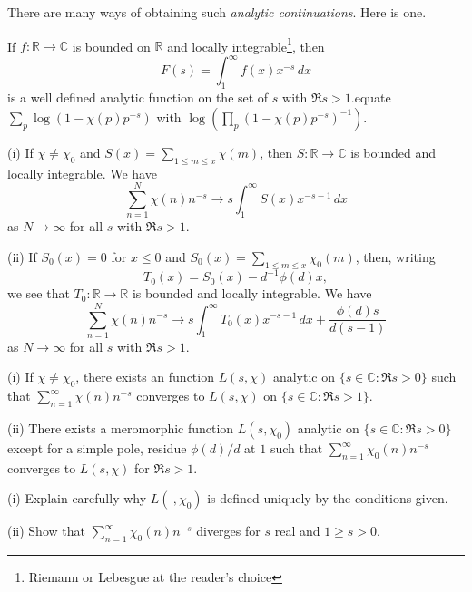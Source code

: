 There are many ways of obtaining such
\emph{analytic continuations}. Here is one.
\begin{lemma} If $f:{\mathbb R}\rightarrow{\mathbb C}$
is bounded on ${\mathbb R}$ and
locally integrable\footnote{Riemann or Lebesgue at
the reader's choice}, then
\[F(s)=\int_{1}^{\infty}f(x)x^{-s}\,dx\]
is a well defined analytic function on the set of $s$ with
$\Re s>1$.equate
$\sum_{p}\log(1-\chi(p)p^{-s})$
with $\log(\prod_{p}(1-\chi(p)p^{-s})^{-1})$.
\end{lemma}
\begin{lemma}\label{Extend Dirichlet 1}
(i) If $\chi\neq \chi_{0}$ and
$S(x)=\sum_{1\leq m\leq x}\chi(m)$, then
$S:{\mathbb R}\rightarrow{\mathbb C}$ is bounded
and locally integrable. We have
\[\sum_{n=1}^{N}\chi(n)n^{-s}
\rightarrow s\int_{1}^{\infty}S(x)x^{-s-1}\, dx\]
as $N\rightarrow\infty$ for all $s$ with $\Re s>1$.

(ii) If $S_{0}(x)=0$ for $x\leq 0$ and
$S_{0}(x)=\sum_{1\leq m\leq x}\chi_{0}(m)$, then,
writing
\[T_{0}(x)=S_{0}(x)-d^{-1}\phi(d)x,\]
we see that
$T_{0}:{\mathbb R}\rightarrow{\mathbb R}$ is bounded
and locally integrable. We have
\[\sum_{n=1}^{N}\chi(n)n^{-s}\rightarrow
s\int_{1}^{\infty}T_{0}(x)x^{-s-1}\, dx+\frac{\phi(d)s}{d(s-1)}\]
as $N\rightarrow\infty$ for all $s$ with $\Re s>1$.
\end{lemma}
\begin{lemma}\label{Extend Dirichlet 2}
(i) If $\chi\neq\chi_{0}$, there exists an
function $L(s,\chi)$
analytic on $\{s\in{\mathbb C}:\Re s>0\}$
such that
$\sum_{n=1}^{\infty} \chi(n)n^{-s}$ converges to
$L(s,\chi)$ on
$\{s\in{\mathbb C}:\Re s>1\}$.

(ii) There exists a meromorphic function $L(s,\chi_{0})$
analytic on $\{s\in{\mathbb C}:\Re s>0\}$ except for
a simple pole, residue $\phi(d)/d$ at $1$ such that
$\sum_{n=1}^{\infty} \chi_{0}(n)n^{-s}$ converges to
$L(s,\chi)$ for $\Re s>1$.
\end{lemma}
\begin{exercise}
(i) Explain carefully why
$L(\ ,\chi_{0})$ is defined uniquely by
the conditions given.

(ii) Show that
$\sum_{n=1}^{\infty} \chi_{0}(n)n^{-s}$ diverges
for $s$ real and $1\geq s >0$.
\end{exercise}

